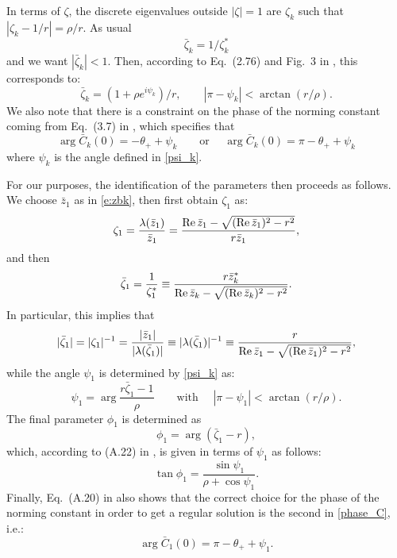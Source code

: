 \documentclass{article}
\def\Re{\mathop{\rm Re}\nolimits}
\begin{document}
In terms of $\zeta$, the discrete eigenvalues outside $|\zeta|=1$ are $\zeta_k$ such that $|\zeta_k-1/r|=\rho/r$. As usual
$$\bar{\zeta}_k=1/\zeta_k^*$$ and we want $|\bar{\zeta}_k|<1$. Then, according to Eq.~(2.76) and Fig.~3 in \cite{ABP07}, this corresponds to:
\begin{equation}
\label{psi_k}
\bar{\zeta}_k=(1+\rho e^{i\psi_k})/r, \qquad |\pi -\psi_k|<\arctan (r/\rho).    
\end{equation}
We also note that there is a constraint on the phase of the norming constant coming from Eq.~(3.7) in \cite{ABP07}, which specifies that
\begin{equation}
\label{phase_C}
\arg \bar{C}_k(0)=-\theta_++\psi_k    \qquad \text{or } \quad \arg \bar{C}_k(0)=\pi-\theta_++\psi_k
\end{equation}
where $\psi_k$ is the angle defined in \eqref{psi_k}.

For our purposes, the identification of the parameters then proceeds as follows. We choose $\bar{z}_1$ as in \eqref{e:zbk}, then first obtain $\zeta_1$ as:
\begin{equation}
\zeta_1=\frac{\lambda(\bar{z}_1)}{\bar{z}_1}=\frac{\Re \bar{z}_1-\sqrt{(\Re \bar{z}_1)^2-r^2}}{r\bar{z}_1},    
\end{equation}
and then 
\begin{equation}
  \bar{\zeta}_1=\frac{1}{\zeta_1^*}\equiv \frac{r\bar{z}_k^*}{\Re \bar{z}_k-\sqrt{(\Re \bar{z}_k)^2-r^2}}.  
\end{equation} In particular, this implies that
\begin{equation}
|\bar{\zeta}_1|=|\zeta_1|^{-1}=\frac{|\bar{z}_1|}{|\lambda(\bar{\zeta}_1)|}\equiv |\lambda(\bar{\zeta}_1)|^{-1}   \equiv \frac{r}{\Re \bar{z}_1-\sqrt{(\Re \bar{z}_1)^2-r^2}}, 
\end{equation}
while the angle $\psi_1$ is determined by \eqref{psi_k} as:
\begin{equation}
\psi_1=\arg \frac{r\bar{\zeta}_1-1}{\rho}  \qquad \text{with } \quad |\pi -\psi_1|<\arctan (r/\rho).  
\end{equation}
The final parameter $\phi_1$ is determined as 
$$
\phi_1=\arg (\bar{\zeta}_1-r),
$$
which, according to (A.22) in \cite{ABP07}, is given in terms of $\psi_1$ as follows:
\begin{equation}
\tan \phi_1=\frac{\sin \psi_1}{\rho+\cos \psi_1}.    
\end{equation}
Finally, Eq.~(A.20) in \cite{ABP07} also shows that the correct choice for the phase of the norming constant in order to get a regular solution is the second in \eqref{phase_C}, i.e.:
\begin{equation}
\arg \bar{C}_1(0)=\pi -\theta_++\psi_1.     
\end{equation}
\end{document}
